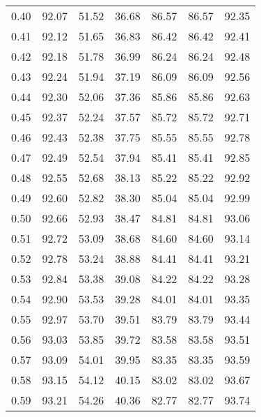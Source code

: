 \begin{tabular}{|c|c|c|c|c|c|c|}
      0.40 &     92.07 &     51.52 &      36.68 &   86.57 &      86.57 &         92.35 \\
      0.41 &     92.12 &     51.65 &      36.83 &   86.42 &      86.42 &         92.41 \\
      0.42 &     92.18 &     51.78 &      36.99 &   86.24 &      86.24 &         92.48 \\
      0.43 &     92.24 &     51.94 &      37.19 &   86.09 &      86.09 &         92.56 \\
      0.44 &     92.30 &     52.06 &      37.36 &   85.86 &      85.86 &         92.63 \\
      0.45 &     92.37 &     52.24 &      37.57 &   85.72 &      85.72 &         92.71 \\
      0.46 &     92.43 &     52.38 &      37.75 &   85.55 &      85.55 &         92.78 \\
      0.47 &     92.49 &     52.54 &      37.94 &   85.41 &      85.41 &         92.85 \\
      0.48 &     92.55 &     52.68 &      38.13 &   85.22 &      85.22 &         92.92 \\
      0.49 &     92.60 &     52.82 &      38.30 &   85.04 &      85.04 &         92.99 \\
      0.50 &     92.66 &     52.93 &      38.47 &   84.81 &      84.81 &         93.06 \\
      0.51 &     92.72 &     53.09 &      38.68 &   84.60 &      84.60 &         93.14 \\
      0.52 &     92.78 &     53.24 &      38.88 &   84.41 &      84.41 &         93.21 \\
      0.53 &     92.84 &     53.38 &      39.08 &   84.22 &      84.22 &         93.28 \\
      0.54 &     92.90 &     53.53 &      39.28 &   84.01 &      84.01 &         93.35 \\
      0.55 &     92.97 &     53.70 &      39.51 &   83.79 &      83.79 &         93.44 \\
      0.56 &     93.03 &     53.85 &      39.72 &   83.58 &      83.58 &         93.51 \\
      0.57 &     93.09 &     54.01 &      39.95 &   83.35 &      83.35 &         93.59 \\
      0.58 &     93.15 &     54.12 &      40.15 &   83.02 &      83.02 &         93.67 \\
      0.59 &     93.21 &     54.26 &      40.36 &   82.77 &      82.77 &         93.74 \\

\end{tabular}
